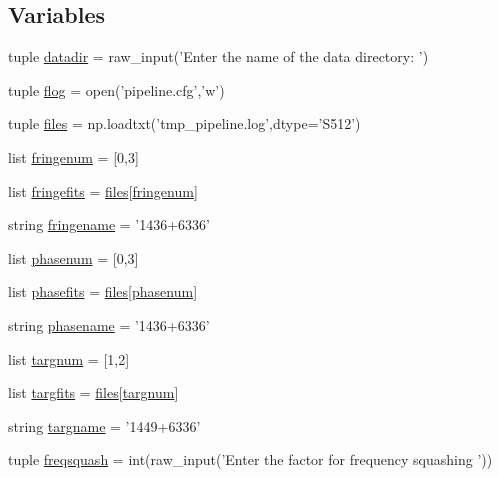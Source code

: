 \subsection*{\-Variables}
\begin{DoxyCompactItemize}
\item 
tuple \hyperlink{namespacepipeline_ac80264ca3205ed250219160b6187dff9}{datadir} = raw\-\_\-input('\-Enter the name of the data directory\-: ')
\item 
tuple \hyperlink{namespacepipeline_a325f1a801713a0281d349dfbff21cb78}{flog} = open('pipeline.\-cfg','w')
\item 
tuple \hyperlink{namespacepipeline_a9c3dea94f17dc5a1da55cb9ca7dea740}{files} = np.\-loadtxt('tmp\-\_\-pipeline.\-log',dtype='\-S512')
\item 
list \hyperlink{namespacepipeline_a6f2fb1d3250f1f8b6bd4535247b8a9a7}{fringenum} = \mbox{[}0,3\mbox{]}
\item 
list \hyperlink{namespacepipeline_a3621af01b0571f7eff023145c99b3401}{fringefits} = \hyperlink{namespacepipeline_a9c3dea94f17dc5a1da55cb9ca7dea740}{files}\mbox{[}\hyperlink{namespacepipeline_a6f2fb1d3250f1f8b6bd4535247b8a9a7}{fringenum}\mbox{]}
\item 
string \hyperlink{namespacepipeline_a3bae9a2cdf4fba11dac330b8005310a4}{fringename} = '1436+6336'
\item 
list \hyperlink{namespacepipeline_ac1c3efa973c83639249a0124f5d0b1be}{phasenum} = \mbox{[}0,3\mbox{]}
\item 
list \hyperlink{namespacepipeline_ae6d6bf5c8ff903dca0d8e8c8c0aa83fb}{phasefits} = \hyperlink{namespacepipeline_a9c3dea94f17dc5a1da55cb9ca7dea740}{files}\mbox{[}\hyperlink{namespacepipeline_ac1c3efa973c83639249a0124f5d0b1be}{phasenum}\mbox{]}
\item 
string \hyperlink{namespacepipeline_a3889949f24f7ee0ddf076131f3ba6faa}{phasename} = '1436+6336'
\item 
list \hyperlink{namespacepipeline_ac1761c5c6599d1ba17c7208c9f78354a}{targnum} = \mbox{[}1,2\mbox{]}
\item 
list \hyperlink{namespacepipeline_a0a1c37799e950441dca0da0fb652ee9a}{targfits} = \hyperlink{namespacepipeline_a9c3dea94f17dc5a1da55cb9ca7dea740}{files}\mbox{[}\hyperlink{namespacepipeline_ac1761c5c6599d1ba17c7208c9f78354a}{targnum}\mbox{]}
\item 
string \hyperlink{namespacepipeline_a16df6cb6fb969f0e5ca43f213ce64118}{targname} = '1449+6336'
\item 
tuple \hyperlink{namespacepipeline_aba50186d512bf0abac666d6240112f06}{freqsquash} = int(raw\-\_\-input('\-Enter the factor for frequency squashing '))

\end{DoxyCompactItemize}

